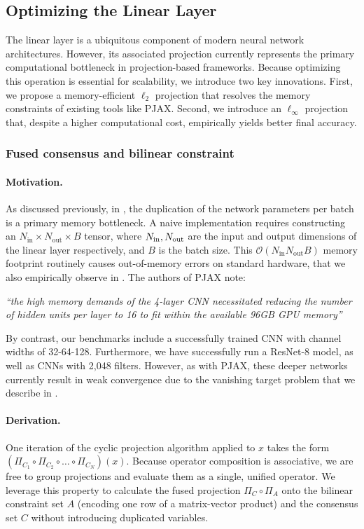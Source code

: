 \documentclass{article}
\let\cref\crtcref
\begin{document}
\subsection{Optimizing the Linear Layer}
The linear layer is a ubiquitous component of modern neural network architectures. However, its associated projection currently represents the primary computational bottleneck in projection-based frameworks. Because optimizing this operation is essential for scalability, we introduce two key innovations. First, we propose a memory-efficient $\ell_2$ projection that resolves the memory constraints of existing tools like PJAX. Second, we introduce an $\ell_\infty$ projection that, despite a higher computational cost, empirically yields better final accuracy.
\label{sec:matmul}
\subsubsection{Fused consensus and bilinear constraint} \label{subsec:fused}
\paragraph{Motivation.}
As discussed previously, in \cite{elser2019learning,bergmeister2025projection}, the duplication of the network parameters per batch is a primary memory bottleneck. A naive implementation requires constructing an $N_{\mathrm{in}} \times N_{\mathrm{out}} \times B$ tensor, where $N_{\mathrm{in}}, N_{\rm out}$ are the input and output dimensions of the linear layer respectively, and $B$ is the batch size. This $\mathcal{O}(N_{\mathrm{in}}N_{\mathrm{out}}B)$ memory footprint routinely causes out-of-memory errors on standard hardware, that we also empirically observe in \cref{sec:exp-memory-optimizer}. The authors of PJAX \cite{bergmeister2025projection} note: 

\textit{``the high memory demands of the 4-layer CNN necessitated reducing the number of hidden units per layer to 16 to fit within the available 96GB GPU memory''}

By contrast, our benchmarks include a successfully trained CNN with channel widths of 32-64-128. Furthermore, we have successfully run a ResNet-8 model, as well as CNNs with 2,048 filters. However, as with PJAX, these deeper networks currently result in weak convergence due to the vanishing target problem that we describe in \cref{sec:vanishing-target}.
\paragraph{Derivation.}
One iteration of the cyclic projection algorithm applied to $x$ takes the form $(\Pi_{C_1} \circ \Pi_{C_2} \circ \dots \circ \Pi_{C_N})(x)$. Because operator composition is associative, we are free to group projections and evaluate them as a single, unified operator. We leverage this property to calculate the fused projection $\Pi_C \circ \Pi_A$ onto the bilinear constraint set $A$ (encoding one row of a matrix-vector product) and the consensus set $C$ without introducing duplicated variables.
\end{document}
